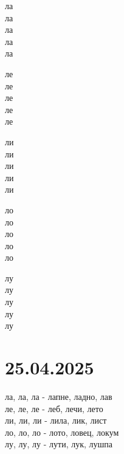 \documentclass[a5paper,12pt]{article}
\newenvironment{activity}[1]{%
  \begin{tcolorbox}[colback=boxcolor,colframe=titlecolor,title={\textbf{#1}},fonttitle=\bfseries]
}{%
  \end{tcolorbox}
}
\begin{document}
\noindent
\begin{minipage}[t]{0.18\textwidth}
ла\\ ла\\ ла\\ ла\\ ла
\end{minipage}
\hfill
\begin{minipage}[t]{0.18\textwidth}
ле\\ ле\\ ле\\ ле\\ ле
\end{minipage}
\hfill
\begin{minipage}[t]{0.18\textwidth}
ли\\ ли\\ ли\\ ли\\ ли
\end{minipage}
\hfill 
\begin{minipage}[t]{0.18\textwidth}
ло\\ ло\\ ло\\ ло\\ ло
\end{minipage}
\hfill 
\begin{minipage}[t]{0.18\textwidth}
  лу\\ лу\\ лу\\ лу\\ лу
\end{minipage}


\section{25.04.2025}
\begin{activity}{Зборчиња}
ла, ла, ла - лапне, ладно, лав\\
ле, ле, ле - леб, лечи, лето\\
ли, ли, ли - лила, лик, лист\\
ло, ло, ло - лото, ловец, локум\\
лу, лу, лу - лути, лук, лушпа
\end{activity}
\end{document}
